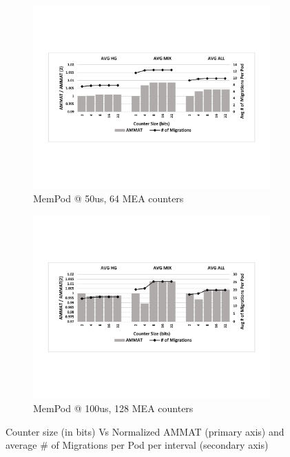 \begin{figure}
	\begin{subfigure}{\linewidth}
    	\includegraphics[width=\linewidth]{figures/revised/new/ctr_size.pdf}
    	\caption{MemPod @ 50us, 64 MEA counters \\ \hfill}\label{fig:counter_size}
	\end{subfigure}
	\begin{subfigure}[b]{\linewidth}
    	\includegraphics[width=\linewidth]{figures/revised/old/ctr_size.pdf}
    	\caption{MemPod @ 100us, 128 MEA counters}\label{fig:counter_size_old}
	\end{subfigure}
	\caption{Counter size (in bits) Vs Normalized AMMAT (primary axis) and average \# of Migrations per Pod per interval (secondary axis)}
\end{figure}

